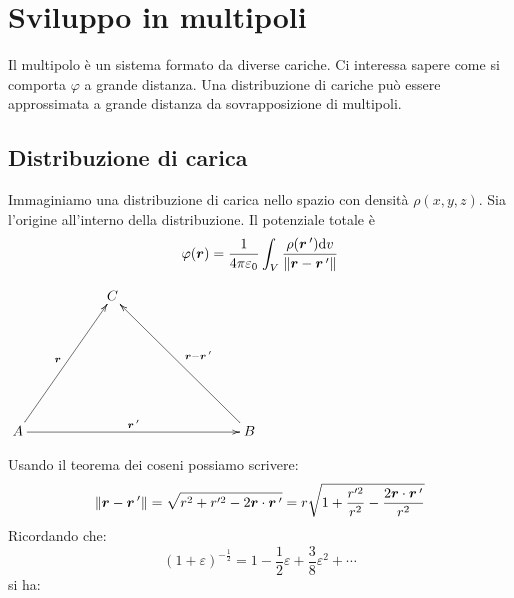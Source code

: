 \section{Sviluppo in multipoli}
Il multipolo è un sistema formato da diverse cariche. Ci interessa sapere come si comporta $\varphi$ a grande distanza. Una distribuzione di cariche può essere approssimata a grande distanza da sovrapposizione di multipoli.
\subsection{Distribuzione di carica}
Immaginiamo una distribuzione di carica nello spazio con densità $\rho(x,y,z)$. Sia l'origine all'interno della distribuzione. Il potenziale totale è
\begin{equation}
  \varphi(\boldsymbol{r})=\frac{1}{4\pi\varepsilon_0}\int_V\frac{\rho(\boldsymbol{r}\,')\mathrm{d} v}{\left\lVert\boldsymbol{r}-\boldsymbol{r}\,'\right\rVert}
  \label{multipolo_01}
\end{equation}
\begin{center}
  $
    \xymatrix{
      &&C&&&\\
      \\
      \\
      A\ar[rruuu]^{\ve r}\ar[rrrrr]^{\ve r\,'}&&&&&B\ar[llluuu]_{\ve r-\ve r\,'}
    }$\end{center}
Usando il teorema dei coseni possiamo scrivere:
\[\left\lVert\boldsymbol{r}-\boldsymbol{r}\,'\right\rVert=\sqrt{r^2+r'^2-2\boldsymbol{r}\cdot \boldsymbol{r}\,'}=r\sqrt{1+\frac{r'^2}{r^2}-\frac{2\boldsymbol{r}\cdot \boldsymbol{r}\,'}{r^2}}\]
Ricordando che:
\[(1+\varepsilon)^{-\frac{1}{2}}=1-\frac{1}{2}\varepsilon+\frac{3}{8}\varepsilon^2+\cdots\]
si ha:
